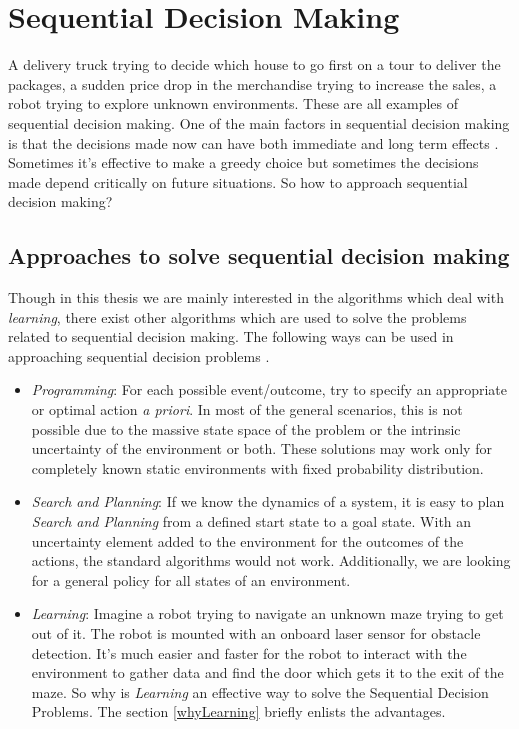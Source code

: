 \documentclass[12pt]{report}
\begin{document}
\section{Sequential Decision Making}
\label{sequential_decision_making}
A delivery truck trying to decide which house to go first on a tour to deliver the packages, a sudden price drop in the merchandise trying to increase the sales, a robot trying to explore unknown environments. These are all examples of sequential decision making. One of the main factors in sequential decision making is that the decisions made now can have both immediate and long term effects \cite{littman1996algorithms}. Sometimes it's effective to make a greedy choice but sometimes the decisions made depend critically on future situations. So how to approach sequential decision making?

\subsection{Approaches to solve sequential decision making}
Though in this thesis we are mainly interested in the algorithms which deal with \textit{learning}, there exist other algorithms which are used to solve the problems related to sequential decision making. The following ways can be used in approaching sequential decision problems \cite{wiering2012reinforcement}. 
\begin{itemize}
\item \textit{Programming}: For each possible event/outcome, try to specify an appropriate or optimal action \textit{a priori}. In most of the general scenarios, this is not possible due to the massive state space of the problem or the intrinsic uncertainty of the environment or both. These solutions may work only for completely known static environments with fixed probability distribution. 

\item \textit{Search and Planning}: If we know the dynamics of a system, it is easy to plan \textit{Search and Planning} from a defined start state to a goal state. With an uncertainty element added to the environment for the outcomes of the actions, the standard algorithms would not work. Additionally, we are looking for a general policy for all states of an environment.

\item \textit{Learning}: Imagine a robot trying to navigate an unknown maze trying to get out of it. The robot is mounted with an onboard laser sensor for obstacle detection. It's much easier and faster for the robot to interact with the environment to gather data and find the door which gets it to the exit of the maze. So why is \textit{Learning} an effective way to solve the Sequential Decision Problems. The section \ref{whyLearning} briefly enlists the advantages.
\end{itemize}
\end{document}
